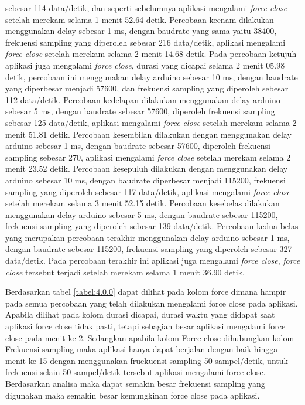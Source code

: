 sebesar 114 data/detik, dan seperti sebelumnya aplikasi mengalami \textit{force close} setelah merekam selama 1 menit 52.64 detik. Percobaan keenam dilakukan menggunakan delay sebesar 1 ms, dengan baudrate yang sama yaitu 38400, frekuensi sampling yang diperoleh sebesar 216 data/detik, aplikasi mengalami \textit{force close} setelah merekam selama 2 menit 14.68 detik. Pada percobaan ketujuh aplikasi juga mengalami \textit{force close}, durasi yang dicapai selama 2 menit 05.98 detik, percobaan ini menggunakan delay arduino sebesar 10 ms, dengan baudrate yang diperbesar menjadi 57600, dan frekuensi sampling yang diperoleh sebesar 112 data/detik. Percobaan kedelapan dilakukan menggunakan delay arduino sebesar 5 ms, dengan baudrate sebesar 57600, diperoleh frekuensi sampling sebesar 125 data/detik, aplikasi mengalami \textit{force close} setelah merekam selama 2 menit 51.81 detik. Percobaan kesembilan dilakukan dengan menggunakan delay arduino sebesar 1 ms, dengan baudrate sebesar 57600, diperoleh frekuensi sampling sebesar 270, aplikasi mengalami \textit{force close} setelah merekam selama 2 menit 23.52 detik. Percobaan kesepuluh dilakukan dengan menggunakan delay arduino sebesar 10 ms, dengan baudrate diperbesar menjadi 115200, frekuensi sampling yang diperoleh sebesar 117 data/detik, aplikasi mengalami \textit{force close} setelah merekam selama 3 menit 52.15 detik. Percobaan kesebelas dilakukan menggunakan delay arduino sebesar 5 ms, dengan baudrate sebesar 115200, frekuensi sampling yang diperoleh sebesar 139 data/detik. Percobaan kedua belas yang merupakan percobaan terakhir menggunakan delay arduino sebesar 1 ms, dengan baudrate sebesar 115200, frekuensi sampling yang diperoleh sebesar 327 data/detik. Pada percobaan terakhir ini aplikasi juga mengalami \textit{force close}, \textit{force close} tersebut terjadi setelah merekam selama 1 menit 36.90 detik. 

Berdasarkan tabel \ref{tabel:4.0.0} dapat dilihat pada kolom force dimana hampir pada semua percobaan yang telah dilakukan mengalami force close pada aplikasi. Apabila dilihat pada kolom durasi dicapai, durasi waktu yang didapat saat aplikasi force close tidak pasti, tetapi sebagian besar aplikasi mengalami force close pada menit ke-2. Sedangkan apabila kolom Force close dihubungkan kolom Frekuensi sampling
maka aplikasi hanya dapat berjalan dengan baik hingga menit ke-15 dengan menggunakan fruekuensi sampling 50 sampel/detik, untuk frekuensi selain 50 sampel/detik tersebut aplikasi mengalami force close. Berdasarkan analisa maka dapat  semakin besar frekuensi sampling yang digunakan maka semakin besar kemungkinan force close pada aplikasi.


